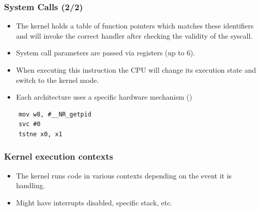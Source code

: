 \begin{frame}[fragile]
  \frametitle{System Calls (2/2)}
  \begin{itemize}
    \item The kernel holds a table of function pointers which matches these
          identifiers and will invoke the correct handler after checking the
          validity of the syscall.
    \item System call parameters are passed via registers (up to 6).
    \item When executing this instruction the CPU will change its execution
    state and switch to the kernel mode.
    \item Each architecture uses a specific hardware mechanism
    ()
  \end{itemize}
  \begin{block}{}
    \begin{verbatim}
    mov w8, #__NR_getpid
    svc #0
    tstne x0, x1
    \end{verbatim}
  \end{block}
\end{frame}

\begin{frame}[fragile]
  \frametitle{Kernel execution contexts}
  \begin{itemize}
    \item The kernel runs code in various contexts depending on the event it is
          handling.
    \item Might have interrupts disabled, specific stack, etc.
  \end{itemize}
\end{frame}

